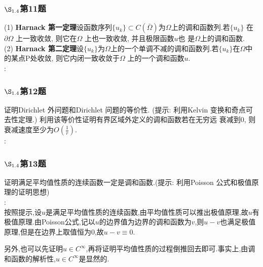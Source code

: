 \documentclass[12pt, a4paper]{ctexart}
\begin{document}
	
	
	\subsubsection{$\S_{1.4}$第11题}
	\kaishu{}
	(1) \textbf{Harnack 第一定理}\quad 设函数序列$\{u_k\} \subset  C(\bar{\Omega}) $为$\Omega$上的调和函数列.若$\{u_k\}$ 在$\partial \Omega$ 上一致收敛, 则它在$\Omega$ 上也一致收敛, 并且极限函数$u $也
	是$\Omega $上的调和函数.\\
	
	(2)\textbf{ Harnack 第二定理}\quad 设$\{u_k\}$为$\Omega$上的一个单调不减的调和函数列.若$\{u_k\}$在$\Omega$中的某点P处收敛, 则它内闭一致收敛于$\Omega$ 上的一个调和函数$u $.\\
	
	\songti{}:\\
	
	\subsubsection{$\S_{1.4}$第12题}
	\kaishu{}证明Dirichlet 外问题和Dirichlet 问题的等价性. (提示: 利用Kelvin 变换和奇点可去性定理.) 利用该等价性证明有界区域外定义的调和函数若在无穷远
	衰减到0, 则衰减速度至少为$O(\frac{1}{r})$.\\

	\songti{}:\\

	\subsubsection{$\S_{1.4}$第13题}
	\kaishu{}证明满足平均值性质的连续函数一定是调和函数.(提示: 利用Poisson 公式和极值原理的证明思想)\\
	
	\songti{}:\\
	
	按照提示,设$u$是满足平均值性质的连续函数,由平均值性质可以推出极值原理,故$u$有极值原理.由Poisson公式,记以$u$的边界值为边界的调和函数为$v$,则$u-v$也满足极值原理,但是在边界上取值恒为0,故$u-v\equiv 0$.
	
	另外,也可以先证明$u\in C^{\infty}$,再将证明平均值性质的过程倒推回去即可.事实上,由调和函数的解析性,$u\in C^{\infty}$是显然的.%
	
\end{document}
